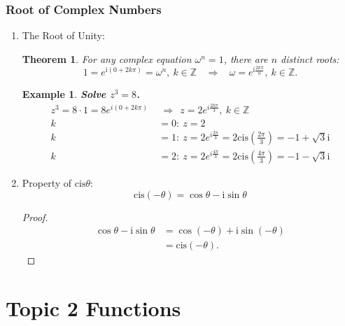 \documentclass[12pt, a4paper]{article}
\newtheorem{theorem}{Theorem}[subsection]
\newtheorem{example}{Example}[subsection]
\newtheorem{proof}{Proof}[subsection]
\def\Z{{\mathbb{Z}}}
\def\i{{\mathrm{i}}}
\def\cis{\mathrm{cis}}
\begin{document}
\subsubsection{Root of Complex Numbers}
\begin{enumerate}
  \item The Root of Unity: 
  \begin{theorem}
    For any complex equation $\omega^n=1$, there are $n$ distinct roots: 
    $$1=e^{\i(0+2k\pi)}=\omega^n,\ k\in\Z\ \ \ \ \Rightarrow\ \ \ \ \omega=e^{\i\frac{2k\pi}{n}},\ k\in\Z.$$
  \end{theorem}
  \begin{example}
    \textbf{Solve $z^3=8$.}
    $$\begin{aligned}
      z^3=8\cdot 1=8e^{i(0+2k\pi)}\ &\ \Rightarrow\ \ z=2e^{i\frac{2k\pi}{3}},\ k\in\Z\\
      k&=0:\ z=2\\
      k&=1:\ z=2e^{i\frac{2\pi}{3}}=2\cis\left(\frac{2\pi}{3}\right)=-1+\sqrt{3}\i\\
      k&=2:\ z=2e^{i\frac{4\pi}{3}}=2\cis\left(\frac{4\pi}{3}\right)=-1-\sqrt{3}\i
    \end{aligned}$$
  \end{example}
  \item Property of $\cis\theta$: 
  $$\cis(-\theta)=\cos\theta-\i\sin\theta$$
  \begin{proof}
    $$\begin{aligned}
      \cos\theta-\i\sin\theta&=\cos(-\theta)+\i\sin(-\theta)\\
      &=\cis(-\theta).
    \end{aligned}$$
  \end{proof}
\end{enumerate}

\newpage
\section{Topic 2 Functions}
\end{document}
